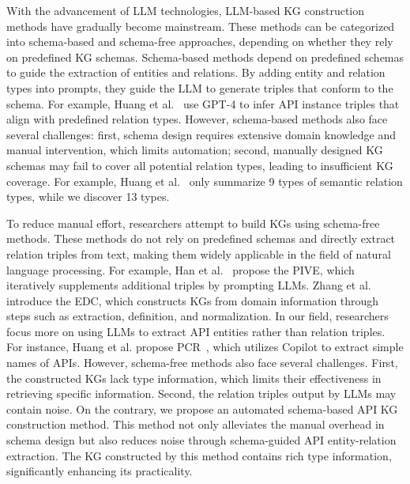 With the advancement of LLM technologies, LLM-based KG construction methods have gradually become mainstream.
These methods can be categorized into schema-based and schema-free approaches, depending on whether they rely on predefined KG schemas. Schema-based methods depend on predefined schemas to guide the extraction of entities and relations.
By adding entity and relation types into prompts, they guide the LLM to generate triples that conform to the schema.
For example, Huang et al.~\cite{yanbang2} use GPT-4 to infer API instance triples that align with predefined relation types.
However, schema-based methods also face several challenges: first, schema design requires extensive domain knowledge and manual intervention, which limits automation;
second, manually designed KG schemas may fail to cover all potential relation types, leading to insufficient KG coverage.
For example, Huang et al.~\cite{Manual} only summarize 9 types of semantic relation types, while we discover 13 types.


To reduce manual effort, researchers attempt to build KGs using schema-free methods.
These methods do not rely on predefined schemas and directly extract relation triples from text, making them widely applicable in the field of natural language processing.
For example, Han et al.~\cite{han2023pive} propose the PIVE, which iteratively supplements additional triples by prompting LLMs. Zhang et al.~\cite{EDC} introduce the EDC, which constructs KGs from domain information through steps such as extraction, definition, and normalization.
In our field, researchers focus more on using LLMs to extract API entities rather than relation triples.
For instance, Huang et al. propose PCR~\cite{PCR}, which utilizes Copilot to extract simple names of APIs.
However, schema-free methods also face several challenges.
First, the constructed KGs lack type information, which limits their effectiveness in retrieving specific information.
Second, the relation triples output by LLMs may contain noise.
On the contrary, we propose an automated schema-based API KG construction method.
This method not only alleviates the manual overhead in schema design but also reduces noise through schema-guided API entity-relation extraction.
The KG constructed by this method contains rich type information, significantly enhancing its practicality.







